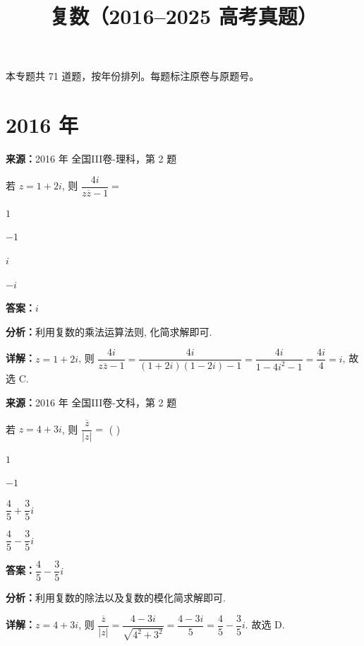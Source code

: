 ﻿\title{复数（2016--2025 高考真题）}
\author{}
\date{}
\maketitle
\noindent 本专题共 71 道题，按年份排列。每题标注原卷与原题号。

\section*{2016 年}

\begin{question}[points=5]
\textbf{来源：}2016 年 全国III卷-理科，第 2 题\par
若 $z=1+2i$, 则 $\dfrac{4i}{z\overline{z}-1}=$
\begin{choices}
  \item $1$
  \item $-1$
  \item $i$
  \item $-i$
\end{choices}
\begin{solution}
\textbf{答案：}$i$

\textbf{分析：}利用复数的乘法运算法则, 化简求解即可.

\textbf{详解：}$z=1+2i$, 则 $\dfrac{4i}{z\overline{z}-1}=\dfrac{4i}{(1+2i)(1-2i)-1}=\dfrac{4i}{1-4i^2-1}=\dfrac{4i}{4}=i$, 故选 C.
\end{solution}
\end{question}

\begin{question}[points=5]
\textbf{来源：}2016 年 全国III卷-文科，第 2 题\par
若 $z=4+3i$, 则 $\dfrac{\overline{z}}{|z|}=$ ( )
\begin{choices}
  \item $1$
  \item $-1$
  \item $\dfrac{4}{5}+\dfrac{3}{5}i$
  \item $\dfrac{4}{5}-\dfrac{3}{5}i$
\end{choices}
\begin{solution}
\textbf{答案：}$\dfrac{4}{5}-\dfrac{3}{5}i$

\textbf{分析：}利用复数的除法以及复数的模化简求解即可.

\textbf{详解：}$z=4+3i$, 则 $\dfrac{\overline{z}}{|z|}=\dfrac{4-3i}{\sqrt{4^2+3^2}}=\dfrac{4-3i}{5}=\dfrac{4}{5}-\dfrac{3}{5}i$. 故选 D.
\end{solution}
\end{question}


